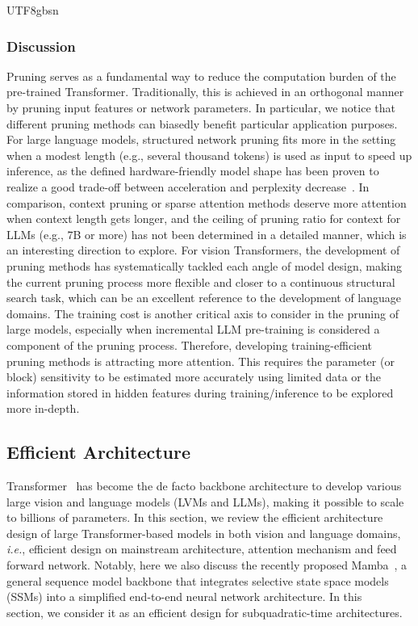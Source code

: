 \documentclass[10pt,journal,compsoc]{IEEEtran}
\newcommand{\ie}{\emph{i.e.}}
\newcommand{\<}{\left\langle}
\renewcommand{\>}{\right\rangle}
\newcommand{\1}{\mathbbm{1}}
\begin{document}
\begin{CJK}{UTF8}{gbsn}
\subsubsection{Discussion} Pruning serves as a fundamental way to reduce the computation burden of the pre-trained Transformer. Traditionally, this is achieved in an orthogonal manner by pruning input features or network parameters. In particular, we notice that different pruning methods can biasedly benefit particular application purposes. For large language models, structured network pruning fits more in the setting when a modest length (e.g., several thousand tokens) is used as input to speed up inference, as the defined hardware-friendly model shape has been proven to realize a good trade-off between acceleration and perplexity decrease~\cite{Xia2023ShearedLA}. In comparison, context pruning or sparse attention methods deserve more attention when context length gets longer, and the ceiling of pruning ratio for context for LLMs (e.g., 7B or more) has not been determined in a detailed manner, which is an interesting direction to explore. For vision Transformers, the development of pruning methods has systematically tackled each angle of model design, making the current pruning process more flexible and closer to a continuous structural search task, which can be an excellent reference to the development of language domains. The training cost is another critical axis to consider in the pruning of large models, especially when incremental LLM pre-training is considered a component of the pruning process. Therefore, developing training-efficient pruning methods is attracting more attention. This requires the parameter (or block) sensitivity to be estimated more accurately using limited data or the information stored in hidden features during training/inference to be explored more in-depth.


\subsection{Efficient Architecture}
\label{sec:effi}

Transformer~\cite{vaswani2017attention} has become the de facto backbone architecture to develop various large vision and language models (LVMs and LLMs), making it possible to scale to billions of parameters. In this section, we review the efficient architecture design of large Transformer-based models in both vision and language domains, \ie, efficient design on mainstream architecture, attention mechanism and feed forward network.
Notably, here we also discuss the recently proposed Mamba~\cite{gu2023mamba}, a general sequence model backbone that integrates selective state space models (SSMs) into a simplified end-to-end neural network architecture. In this\\
	 section, we consider it as an efficient design for subquadratic-time architectures.


\end{CJK}
\end{document}

